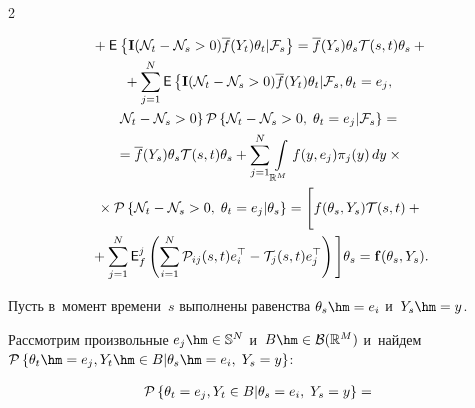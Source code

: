 \begin{multicols}{2}
{\begin{multline*}
{}+


\me{}{\mathbf{I}(\NII_t - \NII_s > 0)\overline{f}(Y_t)\theta_t|\ff_s} =


\overline{f}(Y_s)\theta_s\mathcal{T}(s, t)\theta_s + {}\\ 


{}+   


    \sum\limits_{j=1}^N {\mathsf E} \left\{\mathbf{I}(\NII_t - \NII_s > 0)\overline{f}(Y_t)\theta_t 


|\ff_s, \theta_t = e_j,\right.\\


 \left.\NII_t - \NII_s > 0\right\} \pp{\NII_t - \NII_s > 0,\; \theta_t = e_j| 


\ff_s} ={} \\


{}=


\overline{f}(Y_s)\theta_s\mathcal{T}(s, t)\theta_s +


    \sum\limits_{j=1}^N  \int\limits_{\mathbb{R}^M} f(y, e_j)\pi_j(y)\,dy \times{}\\


    {}\times 


    \pp{\NII_t - \NII_s > 0,\; \theta_t = e_j | \theta_s} ={}


          \Bigg[ f(\theta_s,Y_s)


    \mathcal{T}(s, t)+{}\\


    {}+\sum\limits_{j=1}^N {\mathsf E}_f^{j} \left(\sum\limits_{i=1}^N 


\mathcal{P}_{ij}(s, t)e_i^\top - \mathcal{T}_j(s, t) e_j^\top\right)


    \Bigg]\theta_s = \mathbf{f}(\theta_s, Y_s).


\end{multline*}





Пусть в~момент времени~$s$ выполнены равенства $\theta_s \hm= e_i$ и~$Y_s\hm=y$. 


Рассмотрим произвольные $e_j \hm\in \mathbb{S}^N$ и~$B \hm\in 


\mathcal{B}(\mathbb{R}^M)$ и~найдем $\pp{\theta_t \hm= e_j, Y_t \hm\in B | \theta_s \hm= 


e_i,\;Y_s=y}$:


\begin{multline*}


\pp{\theta_t = e_j, Y_t \in B | \theta_s = e_i,\;Y_s=y}


={}\\



\end{multline*}}
\end{multicols}
